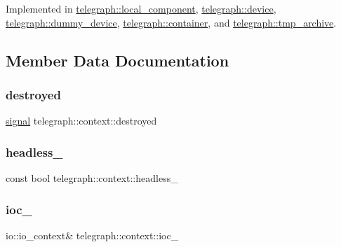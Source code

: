 Implemented in \hyperlink{classtelegraph_1_1local__component_a572a4116130a4b7ad270701eba2af0e7}{telegraph\+::local\+\_\+component}, \hyperlink{classtelegraph_1_1device_aaedca7b20bc36f8439d5afccbcaf1304}{telegraph\+::device}, \hyperlink{classtelegraph_1_1dummy__device_a2d18fd0ec74a6d4bb76f789135403f19}{telegraph\+::dummy\+\_\+device}, \hyperlink{classtelegraph_1_1container_a6c608535adf0fee7783f6684ab4b69c8}{telegraph\+::container}, and \hyperlink{classtelegraph_1_1tmp__archive_a228c2c681beb749268d09cd83d594246}{telegraph\+::tmp\+\_\+archive}.



\subsection{Member Data Documentation}
\mbox{\label{classtelegraph_1_1context_aeae90cedad8326dcd9d6180d1058a10f}} 
\subsubsection{\texorpdfstring{destroyed}{destroyed}}
{\footnotesize\ttfamily \hyperlink{classtelegraph_1_1signal}{signal} telegraph\+::context\+::destroyed}

\mbox{\label{classtelegraph_1_1context_a5053f72fe2b58e264a0ce00de2727953}} 
\subsubsection{\texorpdfstring{headless\+\_\+}{headless\_}}
{\footnotesize\ttfamily const bool telegraph\+::context\+::headless\+\_\+\hspace{0.3cm}{\ttfamily [protected]}}

\mbox{\label{classtelegraph_1_1context_a51949d83373c67e0c9e1050127df30c1}} 
\subsubsection{\texorpdfstring{ioc\+\_\+}{ioc\_}}
{\footnotesize\ttfamily io\+::io\+\_\+context\& telegraph\+::context\+::ioc\+\_\+\hspace{0.3cm}{\ttfamily [protected]}}

